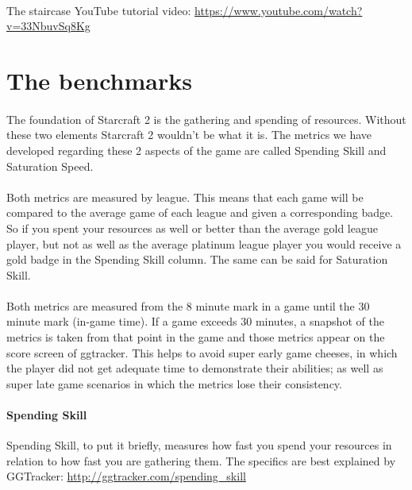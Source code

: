 \documentclass{article}
\begin{document}
\paragraph{}
The staircase YouTube tutorial video:
\url{https://www.youtube.com/watch?v=33NbuvSq8Kg}


\section{The benchmarks}
\paragraph{}
The foundation of Starcraft 2 is the gathering and spending of resources.
Without these two elements Starcraft 2 wouldn’t be what it is. The metrics we
have developed regarding these 2 aspects of the game are called Spending Skill
and Saturation Speed. 

\paragraph{}
Both metrics are measured by league. This means that each game will be compared
to the average game of each league and given a corresponding badge. So if you
spent your resources as well or better than the average gold league player, but
not as well as the average platinum league player you would receive a gold badge
in the Spending Skill column. The same can be said for Saturation Skill.

\paragraph{}
Both metrics are measured from the 8 minute mark in a game until the 30 minute
mark (in-game time). If a game exceeds 30 minutes, a snapshot of the metrics is
taken from that point in the game and those metrics appear on the score screen
of ggtracker. This helps to avoid super early game cheeses, in which the player
did not get adequate time to demonstrate their abilities; as well as super late
game scenarios in which the metrics lose their consistency. 

\paragraph{Spending Skill}
Spending Skill, to put it briefly, measures how fast you spend your resources in
relation to how fast you are gathering them. The specifics are best explained by
GGTracker: \url{http://ggtracker.com/spending_skill}
\end{document}
